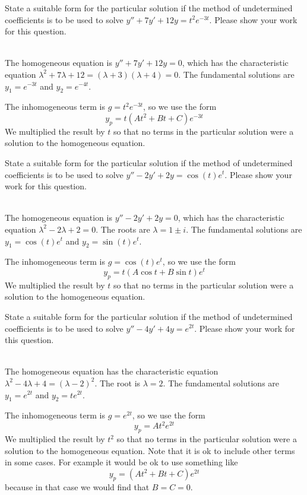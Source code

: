 \ifnum {}
\question[2] State a suitable form for the particular solution if the method of undetermined coefficients is to be used to solve  $y'' + 7y' + 12y=t^2e^{-3t}$. Please show your work for this question. 
\ifnum {} {\color{DarkBlue} \\[12pt] 
The homogeneous equation is $y'' + 7y' + 12y=0$, which has the characteristic equation $\lambda^2 + 7\lambda +12 = (\lambda+3)(\lambda+4)=0$. The fundamental solutions are $y_1 = e^{-3t}$ and $y_2 = e^{-4t}$. 

The inhomogeneous term is $g = t^2e^{-3t}$, so we use the form $$y_p = t (At^2+Bt + C)e^{-3t}$$ We multiplied the result by $t$ so that no terms in the particular solution were a solution to the homogeneous equation. 
} 
\else 
\vspace{3cm}
\fi
\fi 



\ifnum {}
\question[2] State a suitable form for the particular solution if the method of undetermined coefficients is to be used to solve  $y'' - 2y' + 2y=\cos(t) e^t$. Please show your work for this question. 
\ifnum {} {\color{DarkBlue} \\[12pt] 
The homogeneous equation is $y'' - 2y' + 2y=0$, which has the characteristic equation $\lambda^2 - 2\lambda + 2 = 0$. The roots are $\lambda = 1 \pm i$. The fundamental solutions are $y_1 = \cos(t) e^{t}$ and $y_2 = \sin(t)e^t$. 

The inhomogeneous term is $g = \cos(t)e^t$, so we use the form $$y_p = t (A\cos t + B \sin t)e^{t}$$ We multiplied the result by $t$ so that no terms in the particular solution were a solution to the homogeneous equation. 
} 
\else 
\vfill
\fi
\fi 

\ifnum {}
\question[2] State a suitable form for the particular solution if the method of undetermined coefficients is to be used to solve  $y'' - 4y' + 4y=e^{2t}$. Please show your work for this question. 
\ifnum {} {\color{DarkBlue} \\[12pt] 
The homogeneous equation has the characteristic equation $\lambda^2 - 4\lambda + 4 = (\lambda -2)^2$. The root is $\lambda = 2$. The fundamental solutions are $y_1 = e^{2t}$ and $y_2 = te^{2t}$. 

The inhomogeneous term is $g = e^{2t}$, so we use the form $$y_p = At^2e^{2t}$$ We multiplied the result by $t^2$ so that no terms in the particular solution were a solution to the homogeneous equation. Note that it is ok to include other terms in some cases. For example it would be ok to use something like
$$y_p = (At^2+Bt+C)e^{2t}$$
because in that case we would find that $B=C=0$. 
} 
\else 
\vfill
\fi
\fi 


